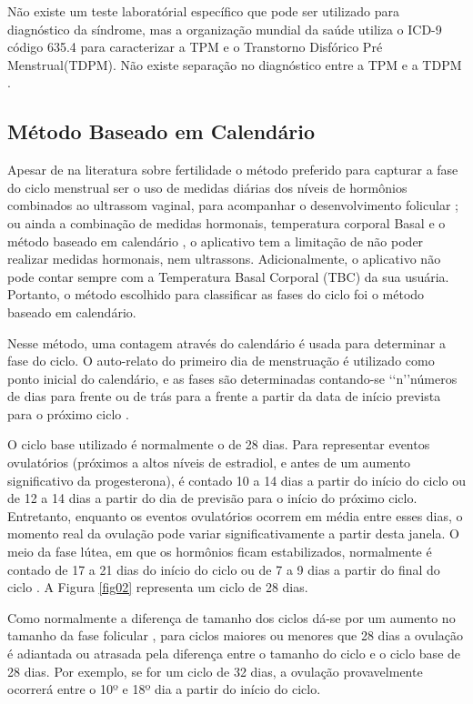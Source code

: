 Não existe um teste laboratórial específico que pode ser utilizado para 
diagnóstico da síndrome, mas a organização mundial da saúde utiliza o ICD-9 
código 635.4 para caracterizar a TPM e o Transtorno Disfórico Pré Menstrual(TDPM). 
Não existe separação no diagnóstico entre a TPM e a TDPM \cite{biggs2011}.

\subsection{Método Baseado em Calendário}

Apesar de na literatura sobre fertilidade o método preferido para capturar 
a fase do ciclo menstrual ser o uso de medidas diárias dos níveis 
de hormônios combinados ao ultrassom vaginal, para acompanhar o 
desenvolvimento folicular \cite{ecochard2001}; ou ainda a
combinação de medidas hormonais, temperatura corporal Basal e o método 
baseado em calendário \cite{becker2005}, o aplicativo tem a limitação de 
não poder realizar medidas hormonais, nem ultrassons. Adicionalmente, 
o aplicativo não pode contar sempre com a Temperatura Basal Corporal (TBC) 
da sua usuária. Portanto, o método escolhido para classificar as 
fases do ciclo foi o método baseado em calendário.


Nesse método, uma contagem através do calendário é usada para determinar 
a fase do ciclo. O auto-relato do primeiro dia de menstruação é 
utilizado como ponto inicial do calendário, e as fases são determinadas 
contando-se \lq \lq n\rq \rq  números de dias para frente ou de trás para 
a frente a partir da data de início prevista para o próximo ciclo \cite{wideman2013}.


O ciclo base utilizado é normalmente o de 28 dias. Para representar eventos
ovulatórios (próximos a altos níveis de estradiol, e antes de um aumento significativo da
progesterona), é contado 10 a 14 dias a partir do início do ciclo ou de 12 a 14 dias a partir do
dia de previsão para o início do próximo ciclo. Entretanto, enquanto os eventos ovulatórios ocorrem
em média entre esses dias, o momento real da ovulação pode variar significativamente
a partir desta janela. O meio da fase lútea, em que os hormônios ficam 
estabilizados, normalmente é contado de 17 a 21 dias do início do ciclo 
ou de 7 a 9 dias a partir do final do ciclo \cite{wideman2013}. 
A Figura \ref{fig02} representa um ciclo de 28 dias.

Como normalmente a diferença de tamanho dos ciclos dá-se por um aumento 
no tamanho da fase folicular \cite{lenton1984a}, para ciclos maiores ou 
menores que 28 dias a ovulação é adiantada ou atrasada pela diferença 
entre o tamanho do ciclo e o ciclo base de 28 dias. Por exemplo, se for 
um ciclo de 32 dias, a ovulação provavelmente ocorrerá entre o 10º e 18º dia 
a partir do início do ciclo.


